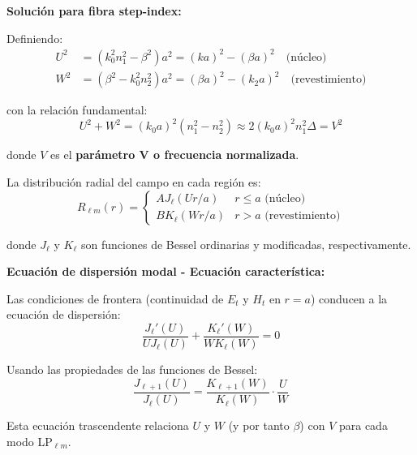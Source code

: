 \documentclass[11pt,a4paper]{article}
\begin{document}
\textbf{Solución para fibra step-index:}

Definiendo:
\begin{align}
    U^2 &= (k_0^2 n_1^2 - \beta^2)a^2 = (ka)^2 - (\beta a)^2 \quad \text{(núcleo)}\\
    W^2 &= (\beta^2 - k_0^2 n_2^2)a^2 = (\beta a)^2 - (k_2a)^2 \quad \text{(revestimiento)}
\end{align}

con la relación fundamental:
\begin{equation}
    U^2 + W^2 = (k_0 a)^2(n_1^2 - n_2^2) \approx 2(k_0 a)^2 n_1^2\Delta = V^2
\end{equation}

donde $V$ es el \textbf{parámetro V o frecuencia normalizada}.

La distribución radial del campo en cada región es:
\begin{equation}
    R_{\ell m}(r) = \begin{cases}
    A J_{\ell}(Ur/a) & r \leq a \text{ (núcleo)}\\
    B K_{\ell}(Wr/a) & r > a \text{ (revestimiento)}
    \end{cases}
\end{equation}

donde $J_{\ell}$ y $K_{\ell}$ son funciones de Bessel ordinarias y modificadas, respectivamente.

\textbf{Ecuación de dispersión modal - Ecuación característica:}

Las condiciones de frontera (continuidad de $E_t$ y $H_t$ en $r = a$) conducen a la ecuación de dispersión:
\begin{equation}
    \frac{J_{\ell}'(U)}{UJ_{\ell}(U)} + \frac{K_{\ell}'(W)}{WK_{\ell}(W)} = 0
\end{equation}

Usando las propiedades de las funciones de Bessel:
\begin{equation}
    \frac{J_{\ell+1}(U)}{J_{\ell}(U)} = \frac{K_{\ell+1}(W)}{K_{\ell}(W)} \cdot \frac{U}{W}
\end{equation}

Esta ecuación trascendente relaciona $U$ y $W$ (y por tanto $\beta$) con $V$ para cada modo LP$_{\ell m}$.
\end{document}
